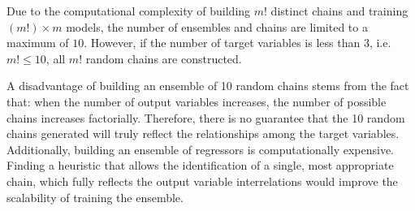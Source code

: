 \documentclass[reqno]{vcuthesis}
\numberwithin{equation}{chapter}
\begin{document}
Due to the computational complexity of building $m!$ distinct chains and training $\left(m!\right) \times m$ models, the number of ensembles and chains are limited to a maximum of $10$. However, if the number of target variables is less than $3$, i.e. $m! \leq 10$, all $m!$ random chains are constructed. 

A disadvantage of building an ensemble of 10 random chains stems from the fact that: when the number of output variables increases, the number of possible chains increases factorially. Therefore, there is no guarantee that the 10 random chains generated will truly reflect the relationships among the target variables. Additionally, building an ensemble of regressors is computationally expensive. Finding a heuristic that allows the identification of a single, most appropriate chain, which fully reflects the output variable interrelations would improve the scalability of training the ensemble. 
\end{document}
